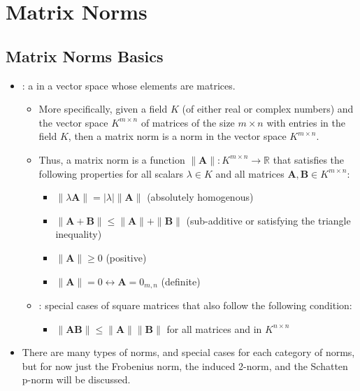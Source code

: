 \chapter{Matrix Norms}\label{Matrix Norms}
\section{Matrix Norms Basics}\label{Matrix Norms Basics}
\begin{itemize}
  \item {}: a \hyperref[Vector Length]{} in a vector space whose elements are matrices.
    \begin{itemize}
      \item More specifically, given a field \(K\) (of either real or complex numbers) and the vector space \(K^{m\times n}\) of matrices of the size \(m\times n\) with entries in the field \(K\), then a matrix norm is a norm in the vector space \(K^{m\times n}\). 
      \item Thus, a matrix norm is a function \( \| \bm{A} \| : K^{m \times n} \to \mathbb{R}\) that satisfies the following properties for all scalars \(\lambda \in K\) and all matrices \(\bm{A},\bm{B} \in K^{m\times n}\): 
      \begin{itemize}
        \item \( \| \lambda\bm{A} \|= |\lambda|\| \bm{A} \| \) (absolutely homogenous)
        \item \( \| \bm{A}+\bm{B} \| \leq \| \bm{A} \| + \| \bm{B} \| \) (sub-additive or satisfying the triangle inequality)
        \item \( \| \bm{A} \| \geq 0\) (positive)
        \item \( \| \bm{A} \| = 0 \leftrightarrow \bm{A}= 0_{m,n} \) (definite)
      \end{itemize}
      \item {}: special cases of square matrices that also follow the following condition:
        \begin{itemize}
          \item \( \| \bm{AB} \| \leq \| \bm{A} \| \| \bm{B} \| \) for all matrices  and  in \(K^{n\times n}\)
        \end{itemize}
    \end{itemize}
  \item There are many types of norms, and special cases for each category of norms, but for now just the Frobenius norm, the induced 2-norm, and the Schatten p-norm will be discussed.
  

\end{itemize}
